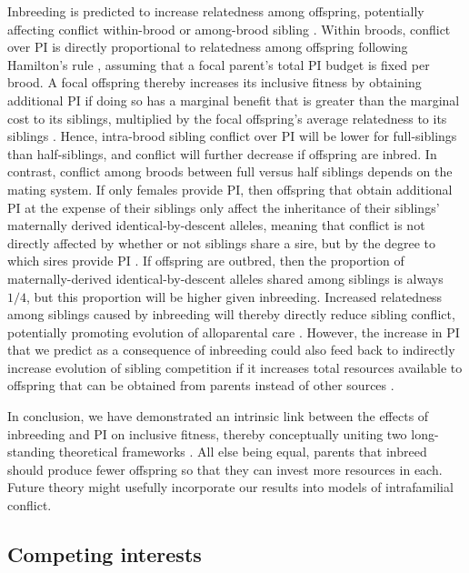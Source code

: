 \documentclass[12pt]{article}
\begin{document}
Inbreeding is predicted to increase relatedness among offspring, potentially affecting conflict within-brood or among-brood sibling \cite{Parker2002, Bonisoli-Alquati2011, Ruch2014}. Within broods, conflict over PI is directly proportional to relatedness among offspring following Hamilton's rule \cite{Hamilton1964, Hamilton1964a}, assuming that a focal parent's total PI budget is fixed per brood. A focal offspring thereby increases its inclusive fitness by obtaining additional PI if doing so has a marginal benefit that is greater than the marginal cost to its siblings, multiplied by the focal offspring's average relatedness to its siblings \cite{Parker2002}. Hence, intra-brood sibling conflict over PI will be lower for full-siblings than half-siblings, and conflict will further decrease if offspring are inbred. In contrast, conflict among broods between full versus half siblings depends on the mating system. If only females provide PI, then offspring that obtain additional PI at the expense of their siblings only affect the inheritance of their siblings' maternally derived identical-by-descent alleles, meaning that conflict is not directly affected by whether or not siblings share a sire, but by the degree to which sires provide PI \cite{Lessells1999, Parker2002}. If offspring are outbred, then the proportion of maternally-derived identical-by-descent alleles shared among siblings is always $1/4$, but this proportion will be higher given inbreeding. Increased relatedness among siblings caused by inbreeding will thereby directly reduce sibling conflict, potentially promoting evolution of alloparental care \cite{Gardner2014c, Davies2016}. However, the increase in PI that we predict as a consequence of inbreeding could also feed back to indirectly increase evolution of sibling competition if it increases total resources available to offspring that can be obtained from parents instead of other sources \cite{Gardner2011a}.

In conclusion, we have demonstrated an intrinsic link between the effects of inbreeding and PI on inclusive fitness, thereby conceptually uniting two long-standing theoretical frameworks \cite[][]{Parker1979, Parker2006, Macnair1978, Parker1978}. All else being equal, parents that inbreed should produce fewer offspring so that they can invest more resources in each. Future theory might usefully incorporate our results into models of intrafamilial conflict.

\subsection*{Competing interests}
\end{document}
